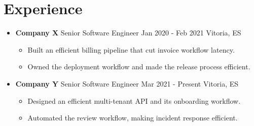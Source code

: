 \documentclass[letterpaper,10pt]{article}
\newcommand{\resumeItem}[1]{\item\small{#1}}
\newcommand{\resumeSubHeadingList}{\begin{itemize}[leftmargin=0.15in, label={}]}
\newcommand{\resumeSubHeadingListEnd}{\end{itemize}}
\newcommand{\resumeSubheading}[4]{
\vspace{-1pt}\item
  \textbf{#1} \textbar{} #3 \textbar{} #2 \textbar{} #4
  \vspace{-7pt}
}
\begin{document}
\section{Experience}
\resumeSubHeadingList
  \resumeSubheading
      {Company X}{Jan 2020 - Feb 2021}
      {Senior Software Engineer}{Vitoria, ES}
      \resumeSubHeadingList
          \resumeItem{Built an efficient billing pipeline that cut invoice workflow latency.}
          \resumeItem{Owned the deployment workflow and made the release process efficient.}
      \resumeSubHeadingListEnd
  \resumeSubheading
      {Company Y}{Mar 2021 - Present}
      {Senior Software Engineer}{Vitoria, ES}
      \resumeSubHeadingList
          \resumeItem{Designed an efficient multi-tenant API and its onboarding workflow.}
          \resumeItem{Automated the review workflow, making incident response efficient.}
      \resumeSubHeadingListEnd
\resumeSubHeadingListEnd
\end{document}
